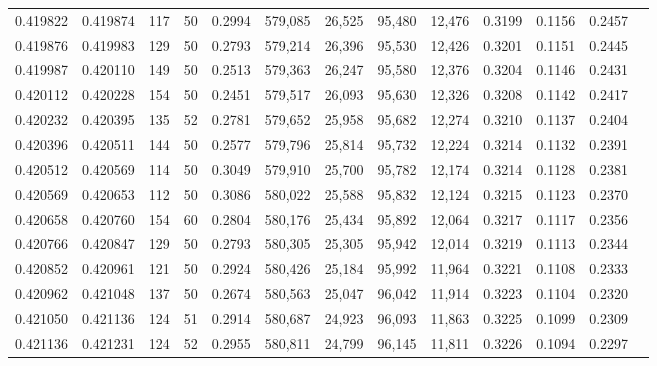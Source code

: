 \begin{tabular}{rrrrrrrrrrrrr}
0.419822 & 0.419874 &   117 &  50 &                                     0.2994 & 579,085 &  26,525 &  95,480 &  12,476 & 0.3199 & 0.1156 & 0.2457 \\
0.419876 & 0.419983 &   129 &  50 &                                     0.2793 & 579,214 &  26,396 &  95,530 &  12,426 & 0.3201 & 0.1151 & 0.2445 \\
0.419987 & 0.420110 &   149 &  50 &                                     0.2513 & 579,363 &  26,247 &  95,580 &  12,376 & 0.3204 & 0.1146 & 0.2431 \\
0.420112 & 0.420228 &   154 &  50 &                                     0.2451 & 579,517 &  26,093 &  95,630 &  12,326 & 0.3208 & 0.1142 & 0.2417 \\
0.420232 & 0.420395 &   135 &  52 &                                     0.2781 & 579,652 &  25,958 &  95,682 &  12,274 & 0.3210 & 0.1137 & 0.2404 \\
0.420396 & 0.420511 &   144 &  50 &                                     0.2577 & 579,796 &  25,814 &  95,732 &  12,224 & 0.3214 & 0.1132 & 0.2391 \\
0.420512 & 0.420569 &   114 &  50 &                                     0.3049 & 579,910 &  25,700 &  95,782 &  12,174 & 0.3214 & 0.1128 & 0.2381 \\
0.420569 & 0.420653 &   112 &  50 &                                     0.3086 & 580,022 &  25,588 &  95,832 &  12,124 & 0.3215 & 0.1123 & 0.2370 \\
0.420658 & 0.420760 &   154 &  60 &                                     0.2804 & 580,176 &  25,434 &  95,892 &  12,064 & 0.3217 & 0.1117 & 0.2356 \\
0.420766 & 0.420847 &   129 &  50 &                                     0.2793 & 580,305 &  25,305 &  95,942 &  12,014 & 0.3219 & 0.1113 & 0.2344 \\
0.420852 & 0.420961 &   121 &  50 &                                     0.2924 & 580,426 &  25,184 &  95,992 &  11,964 & 0.3221 & 0.1108 & 0.2333 \\
0.420962 & 0.421048 &   137 &  50 &                                     0.2674 & 580,563 &  25,047 &  96,042 &  11,914 & 0.3223 & 0.1104 & 0.2320 \\
0.421050 & 0.421136 &   124 &  51 &                                     0.2914 & 580,687 &  24,923 &  96,093 &  11,863 & 0.3225 & 0.1099 & 0.2309 \\
0.421136 & 0.421231 &   124 &  52 &                                     0.2955 & 580,811 &  24,799 &  96,145 &  11,811 & 0.3226 & 0.1094 & 0.2297 \\

\end{tabular}
